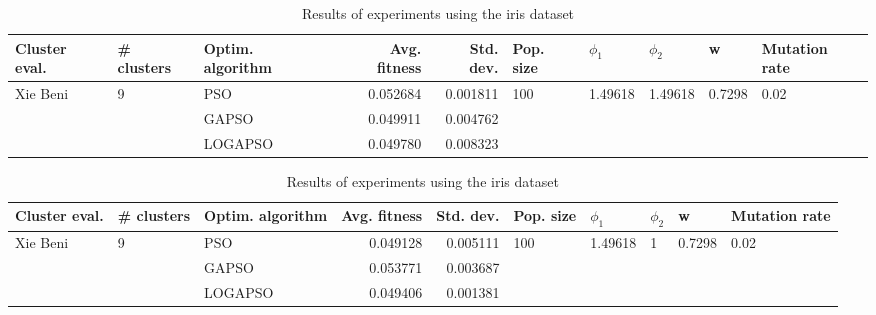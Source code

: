 \documentclass{article}
\begin{document}
\begin{table}
\centering
\caption{Results of experiments using the iris dataset}
\begin{tabular}{lllrrlllll}
\toprule
            Cluster eval. &        \# clusters & Optim. algorithm &  Avg. fitness &  Std. dev. &            Pop. size &               $\phi_{1}$ &               $\phi_{2}$ &                       w &         Mutation rate \\
\midrule
\multirow{3}{*}{Xie Beni} & \multirow{3}{*}{9} &              PSO &      0.052684 &   0.001811 & \multirow{3}{*}{100} & \multirow{3}{*}{1.49618} & \multirow{3}{*}{1.49618} & \multirow{3}{*}{0.7298} & \multirow{3}{*}{0.02} \\
                          &                    &            GAPSO &      0.049911 &   0.004762 &                      &                          &                          &                         &                       \\
                          &                    &          LOGAPSO &      0.049780 &   0.008323 &                      &                          &                          &                         &                       \\
\bottomrule
\end{tabular}
\end{table}
\begin{table}
\centering
\caption{Results of experiments using the iris dataset}
\begin{tabular}{lllrrlllll}
\toprule
            Cluster eval. &        \# clusters & Optim. algorithm &  Avg. fitness &  Std. dev. &            Pop. size &               $\phi_{1}$ &         $\phi_{2}$ &                       w &         Mutation rate \\
\midrule
\multirow{3}{*}{Xie Beni} & \multirow{3}{*}{9} &              PSO &      0.049128 &   0.005111 & \multirow{3}{*}{100} & \multirow{3}{*}{1.49618} & \multirow{3}{*}{1} & \multirow{3}{*}{0.7298} & \multirow{3}{*}{0.02} \\
                          &                    &            GAPSO &      0.053771 &   0.003687 &                      &                          &                    &                         &                       \\
                          &                    &          LOGAPSO &      0.049406 &   0.001381 &                      &                          &                    &                         &                       \\
\bottomrule
\end{tabular}
\end{table}
\end{document}
